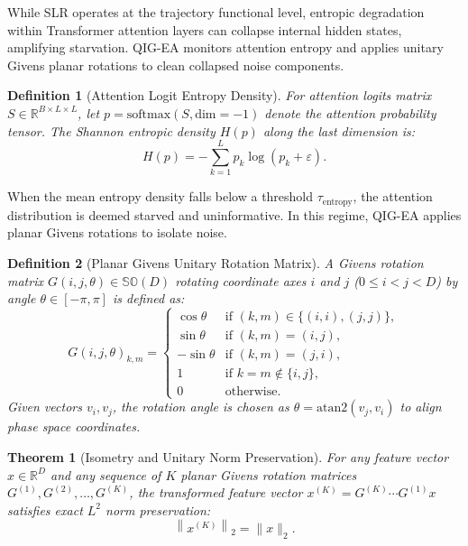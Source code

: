 \documentclass{article}
\newtheorem{theorem}{Theorem}
\newtheorem{definition}{Definition}
\newcommand{\slr}{\textsc{SLR}\xspace}
\newcommand{\qigea}{\textsc{QIG-EA}\xspace}
\begin{document}
While \slr operates at the trajectory functional level, entropic degradation within Transformer attention layers can collapse internal hidden states, amplifying starvation. \qigea monitors attention entropy and applies unitary Givens planar rotations to clean collapsed noise components.

\begin{definition}[Attention Logit Entropy Density]
For attention logits matrix $S \in \mathbb{R}^{B \times L \times L}$, let $p = \text{softmax}(S, \text{dim}=-1)$ denote the attention probability tensor. The Shannon entropic density $H(p)$ along the last dimension is:
\begin{equation}
  H(p) = - \sum_{k=1}^L p_k \log (p_k + \varepsilon).
  \label{eq:entropy_density}
\end{equation}
\end{definition}

When the mean entropy density falls below a threshold $\tau_{\text{entropy}}$, the attention distribution is deemed starved and uninformative. In this regime, \qigea applies planar Givens rotations to isolate noise.

\begin{definition}[Planar Givens Unitary Rotation Matrix]
A Givens rotation matrix $G(i, j, \theta) \in \mathbb{SO}(D)$ rotating coordinate axes $i$ and $j$ ($0 \le i < j < D$) by angle $\theta \in [-\pi, \pi]$ is defined as:
\begin{equation}
  G(i, j, \theta)_{k, m} = \begin{cases}
    \cos\theta & \text{if } (k, m) \in \{(i, i), (j, j)\}, \\
    \sin\theta & \text{if } (k, m) = (i, j), \\
    -\sin\theta & \text{if } (k, m) = (j, i), \\
    1 & \text{if } k = m \notin \{i, j\}, \\
    0 & \text{otherwise}.
  \end{cases}
  \label{eq:givens_matrix}
\end{equation}
Given vectors $v_i, v_j$, the rotation angle is chosen as $\theta = \text{atan2}(v_j, v_i)$ to align phase space coordinates.
\end{definition}

\begin{theorem}[Isometry and Unitary Norm Preservation]
\label{thm:givens_isometry}
For any feature vector $x \in \mathbb{R}^D$ and any sequence of $K$ planar Givens rotation matrices $G^{(1)}, G^{(2)}, \dots, G^{(K)}$, the transformed feature vector $x^{(K)} = G^{(K)} \cdots G^{(1)} x$ satisfies exact $L^2$ norm preservation:
\begin{equation}
  \left\| x^{(K)} \right\|_2 = \|x\|_2.
\end{equation}
\end{theorem}
\end{document}
